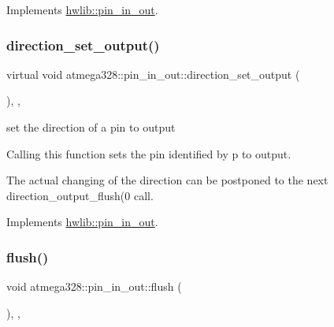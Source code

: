 Implements \hyperlink{classhwlib_1_1pin__in__out_a54ce1a5086d3c9e7b868511b1d46acd0}{hwlib\+::pin\+\_\+in\+\_\+out}.

\mbox{\label{classatmega328_1_1pin__in__out_acb994ef07be4c36fc8742d67f95ac6d4}} 
\subsubsection{\texorpdfstring{direction\+\_\+set\+\_\+output()}{direction\_set\_output()}}
{\footnotesize\ttfamily virtual void atmega328\+::pin\+\_\+in\+\_\+out\+::direction\+\_\+set\+\_\+output (\begin{DoxyParamCaption}{ }\end{DoxyParamCaption})\hspace{0.3cm}{\ttfamily [inline]}, {\ttfamily [override]}, {\ttfamily [virtual]}}

set the direction of a pin to output

Calling this function sets the pin identified by p to output.

The actual changing of the direction can be postponed to the next direction\+\_\+output\+\_\+flush(0 call. 

Implements \hyperlink{classhwlib_1_1pin__in__out_ad08a5f5e9a4c3aadaa7c665b98f2418e}{hwlib\+::pin\+\_\+in\+\_\+out}.

\mbox{\label{classatmega328_1_1pin__in__out_ab8c8298dc5d904dbc49f8b92e39abb7b}} 
\subsubsection{\texorpdfstring{flush()}{flush()}}
{\footnotesize\ttfamily void atmega328\+::pin\+\_\+in\+\_\+out\+::flush (\begin{DoxyParamCaption}{ }\end{DoxyParamCaption})\hspace{0.3cm}{\ttfamily [inline]}, {\ttfamily [override]}, {\ttfamily [virtual]}}

